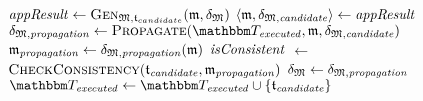 \begin{algorithmic}[1]
             \label{algo:orchestration:provenance:line:loop_start}
                \State $\mathit{appResult} \gets \textsc{Gen}_{\mathfrak{M}, \mathfrak{t}_{candidate}}(\mathfrak{m}, \mathfrak{\delta}_{\mathfrak{M}})$ \label{algo:orchestration:provenance:line:first_execution}
                    \State \Return{$\bot$} \label{algo:orchestration:provenance:line:bot_application}
                \EndIf
                \State $\langle \mathfrak{m}, \mathfrak{\delta}_{\mathfrak{M},\mathit{candidate}} \rangle \gets \mathit{appResult}$
                \State $\changetuple{\metamodeltuple{M},\mathvariable{propagation}} \gets \function{Propagate}(\provalgexecuted, \modeltuple{m}, \changetuple{\metamodeltuple{M},\mathvariable{candidate}})$ \label{algo:orchestration:provenance:line:recursive_call}
                    \State \Return{$\bot$} \label{algo:orchestration:provenance:line:bot_recursion}
                \EndIf
                \State $\mathfrak{m}_{\mathit{propagation}} \gets \mathfrak{\delta}_{\mathfrak{M},\mathit{propagation}}(\mathfrak{m})$ %
                \State $\mathit{isConsistent}$ $\leftarrow$ $\textsc{CheckConsistency}(\mathfrak{t}_{\mathit{candidate}}, \mathfrak{m}_{\mathit{propagation}})$
                 \label{algo:orchestration:provenance:line:bot_failcheck}
                    \State \Return{$\bot$} \label{algo:orchestration:provenance:line:bot_nonreactiveconverging}
                \EndIf
                \State $\mathfrak{\delta}_{\mathfrak{M}} \gets \mathfrak{\delta}_{\mathfrak{M},\mathit{propagation}}$
                \State $\provalgexecuted \gets \provalgexecuted \cup \setted{\provalgcandidate}$ \label{algo:orchestration:provenance:line:executed_update}
            \EndFor
            \State {}
        \EndProcedure
        \end{algorithmic}
